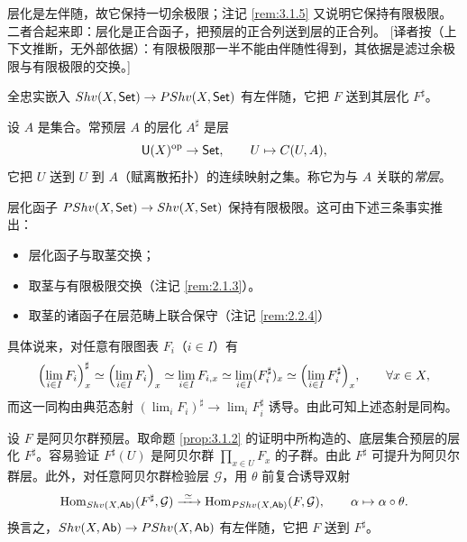 \begin{yizhu}
层化是左伴随，故它保持一切余极限；注记 \ref{rem:3.1.5} 又说明它保持有限极限。二者合起来即：层化是正合函子，把预层的正合列送到层的正合列。
[译者按（上下文推断，无外部依据）：有限极限那一半不能由伴随性得到，其依据是滤过余极限与有限极限的交换。]
\end{yizhu}

\begin{corollary}\label{cor:3.1.3}
全忠实嵌入 $Shv(X,\mathsf{Set})\to PShv(X,\mathsf{Set})$ 有左伴随，它把 $F$ 送到其层化 $F^{\sharp}$。
\end{corollary}

\begin{example}\label{ex:3.1.4}
设 $A$ 是集合。常预层 $A$ 的层化 $A^{\sharp}$ 是层
\[
\mathsf{U}(X)^{\mathrm{op}}\to\mathsf{Set},\qquad U\mapsto C(U,A),
\]
它把 $U$ 送到 $U$ 到 $A$（赋离散拓扑）的连续映射之集。称它为与 $A$ 关联的\emph{常层}。
\end{example}

\begin{remark}\label{rem:3.1.5}
层化函子 $PShv(X,\mathsf{Set})\to Shv(X,\mathsf{Set})$ 保持有限极限。这可由下述三条事实推出：
\begin{itemize}
  \item 层化函子与取茎交换；
  \item 取茎与有限极限交换（注记 \ref{rem:2.1.3}）。
  \item 取茎的诸函子在层范畴上联合保守（注记 \ref{rem:2.2.4}）
\end{itemize}
具体说来，对任意有限图表 $F_i$（$i\in I$）有
\[
\Bigl(\lim_{i\in I}F_i\Bigr)^{\sharp}_x\simeq\Bigl(\lim_{i\in I}F_i\Bigr)_x\simeq\lim_{i\in I}F_{i,x}\simeq\lim_{i\in I}(F_i^{\sharp})_x\simeq\Bigl(\lim_{i\in I}F_i^{\sharp}\Bigr)_x,\qquad \forall x\in X,
\]
而这一同构由典范态射 $(\lim_i F_i)^{\sharp}\to\lim_i F_i^{\sharp}$ 诱导。由此可知上述态射是同构。
\end{remark}

\begin{remark}\label{rem:3.1.6}
设 $F$ 是阿贝尔群预层。取命题 \ref{prop:3.1.2} 的证明中所构造的、底层集合预层的层化 $F^{\sharp}$。容易验证 $F^{\sharp}(U)$ 是阿贝尔群 $\prod_{x\in U}F_x$ 的子群。由此 $F^{\sharp}$ 可提升为阿贝尔群层。此外，对任意阿贝尔群检验层 $\mathcal G$，用 $\theta$ 前复合诱导双射
\[
\operatorname{Hom}_{Shv(X,\mathsf{Ab})}(F^{\sharp},\mathcal G)\xrightarrow{\ \simeq\ }\operatorname{Hom}_{PShv(X,\mathsf{Ab})}(F,\mathcal G),\qquad \alpha\mapsto\alpha\circ\theta.
\]
换言之，$Shv(X,\mathsf{Ab})\to PShv(X,\mathsf{Ab})$ 有左伴随，它把 $F$ 送到 $F^{\sharp}$。
\end{remark}

